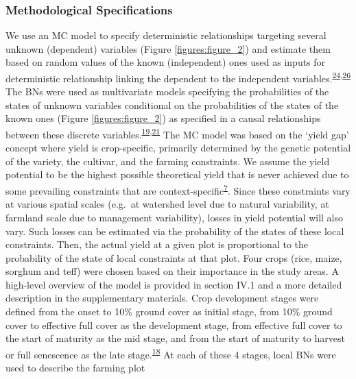 \documentclass[12pt,oneside]{article}
\begin{document}
\hypertarget{methodological-specifications}{%
\subsubsection{Methodological
Specifications}\label{methodological-specifications}}

We use an MC model to specify deterministic relationships targeting
several unknown (dependent) variables (Figure \ref{figures:figure_2})
and estimate them based on random values of the known (independent) ones
used as inputs for deterministic relationship linking the dependent to
the independent
variables.\textsuperscript{\protect\hyperlink{ref-Rosenstock_et_al_2014}{24},\protect\hyperlink{ref-Luedeling_et_al_2015}{26}}
The BNs were used as multivariate models specifying the probabilities of
the states of unknown variables conditional on the probabilities of the
states of the known ones (Figure \ref{figures:figure_2}) as specified in
a causal relationships between these discrete
variables.\textsuperscript{\protect\hyperlink{ref-Pearl_1988}{19},\protect\hyperlink{ref-Jensen_1996}{21}}
The MC model was based on the `yield gap' concept where yield is
crop-specific, primarily determined by the genetic potential of the
variety, the cultivar, and the farming constraints. We assume the yield
potential to be the highest possible theoretical yield that is never
achieved due to some prevailing constraints that are
context-specific\textsuperscript{\protect\hyperlink{ref-VanIttersum_et_al_2013}{7}}.
Since these constraints vary at various spatial scales (e.g.~at
watershed level due to natural variability, at farmland scale due to
management variability), losses in yield potential will also vary. Such
losses can be estimated via the probability of the states of these local
constraints. Then, the actual yield at a given plot is proportional to
the probability of the state of local constraints at that plot. Four
crops (rice, maize, sorghum and teff) were chosen based on their
importance in the study areas. A high-level overview of the model is
provided in section IV.1 and a more detailed description in the
supplementary materials. Crop development stages were defined from the
onset to 10\% ground cover as initial stage, from 10\% ground cover to
effective full cover as the development stage, from effective full cover
to the start of maturity as the mid stage, and from the start of
maturity to harvest or full senescence as the late
stage.\textsuperscript{\protect\hyperlink{ref-Allen_et_al_1998}{18}} At
each of these 4 stages, local BNs were used to describe the farming plot
\end{document}
